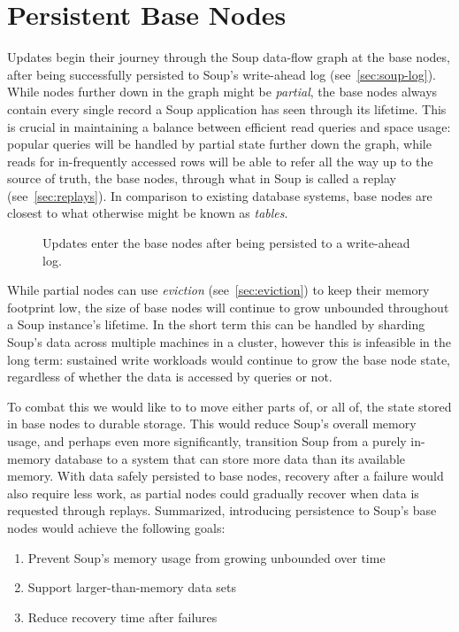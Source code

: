 \chapter{Persistent Base Nodes}\label{chap:persistent-bases}

Updates begin their journey through the Soup data-flow graph at the base nodes,
after being successfully persisted to Soup's write-ahead log
(see~\ref{sec:soup-log}). While nodes further down in the graph might be
\textit{partial}, the base nodes always contain every single record a Soup
application has seen through its lifetime. This is crucial in maintaining a
balance between efficient read queries and space usage: popular queries will be
handled by partial state further down the graph, while reads for in-frequently
accessed rows will be able to refer all the way up to the source of truth, the
base nodes, through what in Soup is called a replay (see~\ref{sec:replays}). In
comparison to existing database systems, base nodes are closest to what
otherwise might be known as \textit{tables}.

\begin{figure}[H]
  \centering
  
  \caption{Updates enter the base nodes after being persisted to a write-ahead
  log.}
\end{figure}

While partial nodes can use \textit{eviction} (see~\ref{sec:eviction}) to keep
their memory footprint low, the size of base nodes will continue to grow
unbounded throughout a Soup instance's lifetime. In the short term this can be
handled by sharding Soup's data across multiple machines in a cluster, however
this is infeasible in the long term: sustained write workloads would continue to
grow the base node state, regardless of whether the data is accessed by queries
or not.

To combat this we would like to to move either parts of, or all of, the state
stored in base nodes to durable storage. This would reduce Soup's overall memory
usage, and perhaps even more significantly, transition Soup from a purely
in-memory database to a system that can store more data than its available
memory. With data safely persisted to base nodes, recovery after a failure would
also require less work, as partial nodes could gradually recover when data is
requested through replays. Summarized, introducing persistence to Soup's base
nodes would achieve the following goals:

\begin{enumerate}
  \item Prevent Soup's memory usage from growing unbounded over time
  \item Support larger-than-memory data sets
  \item Reduce recovery time after failures
\end{enumerate}

